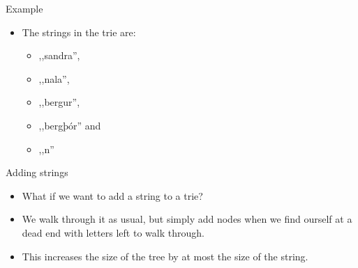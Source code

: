 \documentclass{beamer}
\begin{document}
\begin{frame}[plain]{Example}
		\begin{itemize}
			\item<2-> The strings in the trie are:
			\begin{itemize}
				\item<3-> ,,sandra'',
				\item<4-> ,,nala'',
				\item<5-> ,,bergur'',
				\item<6-> ,,bergþór'' and
				\item<7-> ,,n''
			\end{itemize}
		\end{itemize}
	\end{frame}
	
	\begin{frame}[plain]{Adding strings}
		\begin{itemize}
			\item What if we want to add a string to a trie?
			\item We walk through it as usual, but simply add nodes when we find ourself at a dead end with letters left to walk through.
			\item This increases the size of the tree by at most the size of the string.
		\end{itemize}
	\end{frame}
	
\end{document}
